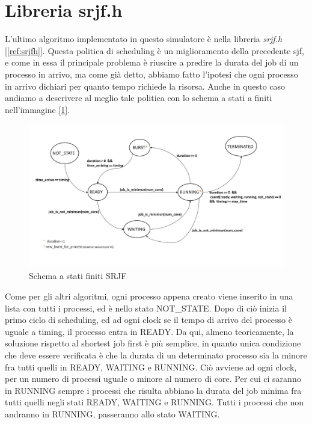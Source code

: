 \documentclass[Lau, oneside]{sapthesis}%
\begin{document}
\section{Libreria srjf.h}
\label{sec:srjf.h}
L'ultimo algoritmo implementato in questo simulatore è nella libreria \textit{srjf.h} \hyperref[ref:srjfh]{[\ref*{ref:srjfh}]}.
Questa politica di scheduling è un miglioramento della precedente sjf, e come in essa il principale problema è riuscire a predire la durata del job di un processo in arrivo, ma come già detto, abbiamo fatto l'ipotesi che ogni processo in arrivo dichiari per quanto tempo richiede la risorsa.
Anche in questo caso andiamo a descrivere al meglio tale politica con lo schema a stati a finiti nell'immagine \hyperref[figura:srjf]{[\ref*{figura:srjf}]}.
\begin{figure}[ht!]
  \centering
  \includegraphics[width=1\textwidth]{Schema a stati finiti SRJF.jpg}
  \caption{Schema a stati finiti SRJF}
  \label{figura:srjf}
\end{figure}
Come per gli altri algoritmi, ogni processo appena creato viene inserito in una lista con tutti i processi, ed è nello stato NOT\_STATE.
Dopo di ciò inizia il primo ciclo di scheduling, ed ad ogni clock se il tempo di arrivo del processo è uguale a timing, il processo entra in READY.
Da qui, almeno teoricamente, la soluzione rispetto al shortest job first è più semplice, in quanto unica condizione che deve essere verificata è che la durata di un determinato processo sia la minore fra tutti quelli in READY, WAITING e RUNNING.
Ciò avviene ad ogni clock, per un numero di processi uguale o minore al numero di core.
Per cui ci saranno in RUNNING sempre i processi che risulta abbiano la durata del job minima fra tutti quelli negli stati READY, WAITING e RUNNING.
Tutti i processi che non andranno in RUNNING, passeranno allo stato WAITING.
\end{document}

